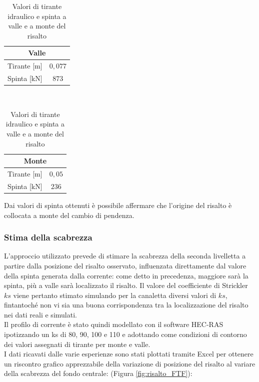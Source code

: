 \documentclass[12pt]{article} %
\begin{document}
\begin{table}[H]
\begin{minipage}[b]{8cm}
    \raggedleft
    \begin{tabular}{cc}
    \hline
    \multicolumn{2}{c}{\textbf{Valle}}\\
        \hline
        Tirante [m] & $0,077$ \\
        Spinta [kN] & $873$\\
        \hline
    \end{tabular}
\end{minipage}
\ \hspace{1.5cm}  \
\begin{minipage}[b]{8cm}
    \raggedright
    \begin{tabular}{cc}
    \hline
    \multicolumn{2}{c}{\textbf{Monte}}\\
        \hline
        Tirante [m] & $0,05$ \\
        Spinta [kN] & $236$ \\
        \hline
    \end{tabular}
\end{minipage}
\caption{Valori di tirante idraulico e spinta a valle e a monte del risalto}
\end{table}

\noindent Dai valori di spinta ottenuti è possibile affermare che l'origine del risalto è collocata a monte del cambio di pendenza.


\subsubsection{Stima della scabrezza}

\noindent L'approccio utilizzato prevede di stimare la scabrezza della seconda livelletta a partire dalla posizione del risalto osservato, influenzata direttamente dal valore della spinta generata dalla corrente: come detto in precedenza, maggiore sarà la spinta, più a valle sarà localizzato il risalto. Il valore del coefficiente di Strickler $ks$ viene pertanto stimato simulando per la canaletta diversi valori di $ks$, fintantoché non vi sia una buona corrispondenza tra la localizzazione del risalto nei dati reali e simulati.\\
Il profilo di corrente è stato quindi modellato con il software HEC-RAS ipotizzando un ks di 80, 90, 100 e 110 e adottando come condizioni di contorno dei valori assegnati di tirante per monte e valle.\\
I dati ricavati dalle varie esperienze sono stati plottati tramite Excel per ottenere un riscontro grafico apprezzabile della variazione di posizione del risalto al variare della scabrezza del fondo centrale: (Figura \ref{fig:risalto_FTF}):
\end{document}
